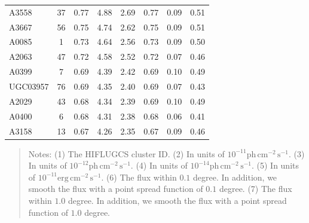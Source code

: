 \documentclass[10pt,aps,pra,reprint,amsmath,amsfonts,amssymb,showpacs,nofootinbib,floatfix]{revtex4-1}
\newcommand{\rmn}{\mathrm}
\begin{document}
\begin{table}
\begin{minipage}{2.0\columnwidth}
\begin{tabular}{l  c c c c c c c}
A3558    &  37 &   0.77 &   4.88 &   2.69 &   0.77 &   0.09 &   0.51 \\
A3667    &  56 &   0.75 &   4.74 &   2.62 &   0.75 &   0.09 &   0.51 \\
A0085    &   1 &   0.73 &   4.64 &   2.56 &   0.73 &   0.09 &   0.50 \\
A2063    &  47 &   0.72 &   4.58 &   2.52 &   0.72 &   0.07 &   0.46 \\
A0399    &   7 &   0.69 &   4.39 &   2.42 &   0.69 &   0.10 &   0.49 \\
UGC03957 &  76 &   0.69 &   4.35 &   2.40 &   0.69 &   0.07 &   0.43 \\
A2029    &  43 &   0.68 &   4.34 &   2.39 &   0.69 &   0.10 &   0.49 \\
A0400    &   6 &   0.68 &   4.31 &   2.38 &   0.68 &   0.06 &   0.41 \\
A3158    &  13 &   0.67 &   4.26 &   2.35 &   0.67 &   0.09 &   0.46 \\
\hline
\hline
\end{tabular}
\begin{quote}
  Notes: 
   (1) The HIFLUGCS cluster ID.
   (2) In units of  $10^{-11} \rmn{ph}\,\rmn{cm}^{-2}\,\rmn{s}^{-1}$.
   (3) In units of  $10^{-12} \rmn{ph}\,\rmn{cm}^{-2}\,\rmn{s}^{-1}$.
   (4) In units of  $10^{-14} \rmn{ph}\,\rmn{cm}^{-2}\,\rmn{s}^{-1}$.
   (5) In units of  $10^{-11} \rmn{erg}\,\rmn{cm}^{-2}\,\rmn{s}^{-1}$.
   (6) The flux within $0.1$ degree. In addition, we smooth the flux with a point spread function of $0.1$ degree. 
   (7) The flux within $1.0$ degree. In addition, we smooth the flux with a point spread function of $1.0$ degree. 
  \label{tab:flux_tab_BM}
  \end{quote}
\end{minipage}
\end{table} 
\end{document}
